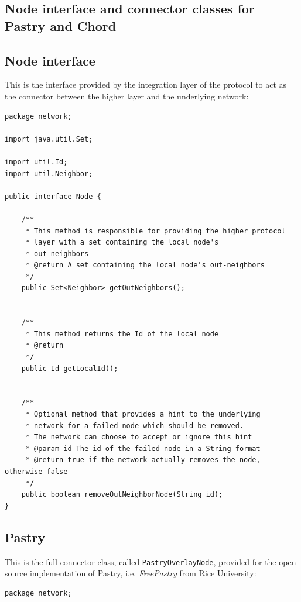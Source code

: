 \documentclass[a4paper,11pt,twoside]{report}
\newcommand{\classname}[1]{\texttt{#1}}
\newcommand{\blankpage}{
\newpage
\thispagestyle{empty}
\mbox{}
\newpage
}
\begin{document}



\blankpage

\begin{appendices}

\blankpage
\chapter{Node interface and connector classes for Pastry and Chord}

\section{Node interface}

This is the interface provided by the integration layer of the protocol to act as the connector between the higher layer and the underlying network:

\begin{lstlisting}
package network;

import java.util.Set;

import util.Id;
import util.Neighbor;

public interface Node {

	/**
	 * This method is responsible for providing the higher protocol
	 * layer with a set containing the local node's
	 * out-neighbors
	 * @return A set containing the local node's out-neighbors
	 */
	public Set<Neighbor> getOutNeighbors();
	
	
	/**
	 * This method returns the Id of the local node 
	 * @return
	 */
	public Id getLocalId();
	
	
	/**
	 * Optional method that provides a hint to the underlying
	 * network for a failed node which should be removed. 
	 * The network can choose to accept or ignore this hint
	 * @param id The id of the failed node in a String format
	 * @return true if the network actually removes the node, otherwise false
	 */
	public boolean removeOutNeighborNode(String id);
}

\end{lstlisting}

\section{Pastry}
This is the full connector class, called \classname{PastryOverlayNode}, provided for the open source implementation of Pastry, i.e. \textit{FreePastry} from Rice University:

\begin{lstlisting}
package network;


\end{lstlisting}
\end{appendices}
\end{document}
